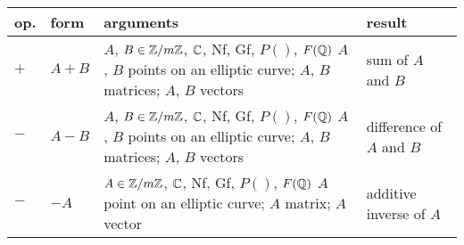\begin{tabular}{|p{0.3in}|p{0.65in}|p{2.5in}|p{1.88in}|} \hline
{\bf op.} & {\bf form} & {\bf arguments} & {\bf result} \\ \hline

{\bf $+$} &
{\bf $A+B$} &
$A$, $B\in \mbox{$\mathbb Z$}/m\mbox{$\mathbb Z$}$, $\mbox{$\mathbb C$}$, Nf, Gf, $P()$, $F(\mbox{$\mathbb Q$})$\newline
$A$, $B$ points on an elliptic curve;\newline
$A$, $B$ matrices; $A$, $B$ vectors &
sum of $A$ and $B$\\ \hline

{\bf $-$} &
{\bf $A-B$} &
$A$, $B\in \mbox{$\mathbb Z$}/m\mbox{$\mathbb Z$}$, $\mbox{$\mathbb C$}$, Nf, Gf, $P()$, $F(\mbox{$\mathbb Q$})$\newline
$A$, $B$ points on an elliptic curve;\newline
$A$, $B$ matrices; $A$, $B$ vectors &
difference of $A$ and $B$\\ \hline

{\bf $-$ } &
{\bf $-A$} &
$A\in \mbox{$\mathbb Z$}/m\mbox{$\mathbb Z$}$, $\mbox{$\mathbb C$}$, Nf, Gf, $P()$, $F(\mbox{$\mathbb Q$})$\newline
$A$ point on an elliptic curve;\newline
$A$ matrix; $A$ vector &
additive inverse of $A$ \\ \hline
\end{tabular}

\newpage

